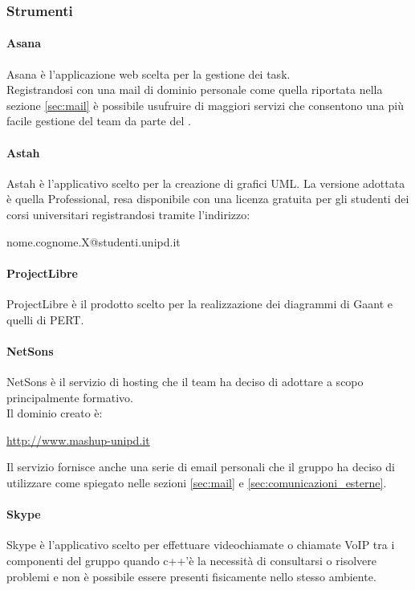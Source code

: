 		\subsubsection{Strumenti}
			\paragraph{Asana}
			\label{sec:asana}
			Asana\gloss{} è l'applicazione web scelta per la gestione dei task\gloss{}.\\
			Registrandosi con una mail di dominio personale come quella riportata nella sezione \ref{sec:mail} è possibile usufruire di maggiori servizi che consentono una più facile gestione del team da parte del \roleProjectManager.
			\paragraph{Astah}
			Astah\gloss{} è l'applicativo scelto per la creazione di grafici UML\gloss{}.
			La versione adottata è quella Professional, resa disponibile con una licenza gratuita per gli studenti dei corsi universitari registrandosi tramite l'indirizzo:
				\begin{center}
					nome.cognome.X@studenti.unipd.it
				\end{center}

			\paragraph{ProjectLibre}
			ProjectLibre\gloss{} è il prodotto scelto per la realizzazione dei diagrammi di Gaant e quelli di PERT\gloss{}.
			\paragraph{NetSons}
			NetSons è il servizio di hosting che il team ha deciso di adottare a scopo principalmente formativo. \\
			Il dominio creato è:
				\begin{center}
					\url{http://www.mashup-unipd.it}
				\end{center}
			Il servizio fornisce anche una serie di email personali che il gruppo ha deciso di utilizzare come spiegato nelle sezioni \ref{sec:mail} e \ref{sec:comunicazioni_esterne}.
			\paragraph{Skype}
			Skype è l'applicativo scelto per effettuare videochiamate o chiamate VoIP tra i componenti del gruppo quando c++\gloss{}'è la necessità di consultarsi o risolvere problemi e non è possibile essere presenti fisicamente nello stesso ambiente.		
